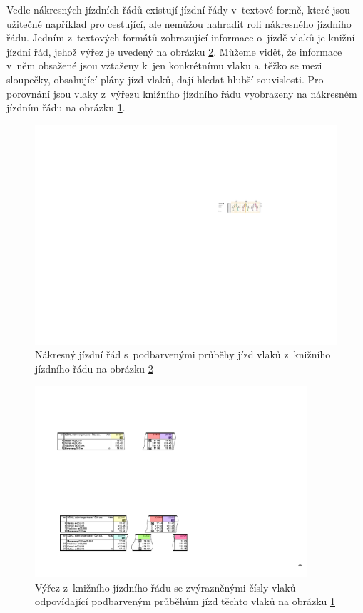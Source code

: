 Vedle nákresných jízdních řádů existují jízdní řády v~textové formě, které jsou užitečné například pro cestující, ale nemůžou nahradit roli nákresného jízdního řádu. Jedním z~textových formátů zobrazující informace o~jízdě vlaků je knižní jízdní řád, jehož výřez je uvedený na obrázku \ref{fig:uvod:kjr}. Můžeme vidět, že informace v~něm obsažené jsou vztaženy k~jen konkrétnímu vlaku a~těžko se mezi sloupečky, obsahující plány jízd vlaků, dají hledat hlubší souvislosti. Pro porovnání jsou vlaky z~výřezu knižního jízdního řádu vyobrazeny na nákresném jízdním řádu na obrázku \ref{fig:uvod:njr_vyrez}.

\begin{figure}[ht]
	\centering
	\includegraphics[width=\textwidth]{../img/kap1_uvod_grafikon_kjr_vyrez}
	\caption{Nákresný jízdní řád s~podbarvenými průběhy jízd vlaků z~knižního jízdního řádu na obrázku \ref{fig:uvod:kjr}}
	\label{fig:uvod:njr_vyrez}
\end{figure}

\begin{figure}[ht]
	\centering
	\includegraphics[width=0.9\textwidth]{../img/kap1_kjr_moravany_holice_vyrez}
	\caption{Výřez z~knižního jízdního řádu se zvýrazněnými čísly vlaků odpovídající podbarveným průběhům jízd těchto vlaků na obrázku \ref{fig:uvod:njr_vyrez}}
	\label{fig:uvod:kjr}
\end{figure}

